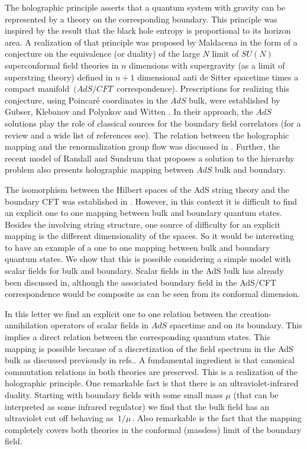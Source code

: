 \documentclass[a4paper,12pt]{article}
\begin{document}
The holographic principle asserts that  a 
quantum system with gravity can be represented by  a theory on the 
corresponding boundary\cite{HOL1,HOL2,HOL3}.
This principle was inspired by the  result that the black hole
entropy is proportional to its horizon area\cite{BHE1,BHE2}.
A realization of that principle was proposed by Maldacena in the form of a 
conjecture\cite{Malda} on the equivalence (or duality) of the large 
$N$ limit of $SU(N)$ superconformal field theories in $n$
dimensions with supergravity (as a limit of superstring theory) defined in 
$n+1$ dimensional anti de Sitter spacetime
times a compact manifold $\,(AdS/CFT\,$ correspondence). 
Prescriptions for realizing this conjecture, using Poincar\'e 
coordinates in the $AdS$ bulk, were established by  
Gubser, Klebanov and Polyakov \cite{GKP} and  Witten \cite{Wi}. 
In their approach, the $AdS$ solutions play the role of 
classical sources for the boundary field correlators (for a review and a wide list
of references see\cite{Pe,Malda2}).
The relation between the holographic mapping and the 
renormalization group flow was discussed in \cite{BK}.
Further, the recent model of Randall and Sundrum\cite{RS} that proposes a solution
to the  hierarchy problem also presents holographic mapping between $AdS$ bulk and 
boundary\cite{Ve}. 


The isomorphism between  the Hilbert spaces of the AdS string theory and
the boundary CFT was established in \cite{HS1,HS2,HS3,HS4}.
However, in this context it is difficult to find an explicit one to one mapping
between bulk and boundary quantum states.
Besides the involving string structure, one source of difficulty for an explicit 
mapping is the different dimensionality of the spaces.
So it would be interesting to have an example of a one to one mapping 
between bulk and boundary quantum states. We show that this is possible 
considering a simple model with scalar fields for bulk and boundary.
Scalar fields in the AdS bulk has already been discussed in\cite{GKP,Wi},
although the associated boundary field in the AdS/CFT correspondence would be composite 
as can be seen from its conformal dimension.


In this letter we find an explicit one to one relation  between the 
creation-annihilation operators of scalar fields  in $AdS$ spacetime and on 
its boundary. This implies a direct relation between the corresponding quantum states.
This mapping is possible because of a discretization of the field spectrum in
the AdS bulk as discussed previously in refs.\cite{BB1,BB2}.
A fundamental ingredient is that canonical commutation relations in both theories 
are preserved. This is a realization of the holographic principle.
One remarkable fact is that there is an ultraviolet-infrared duality.
Starting with boundary fields with some small mass $\mu$ (that can be interpreted
as some infrared regulator) we find that the bulk field has an ultraviolet
cut off behaving as $\,1/\mu\,$.  Also remarkable is the fact that the mapping 
completely covers  both theories  in  the conformal (massless) limit of the
boundary field. 
\end{document}
